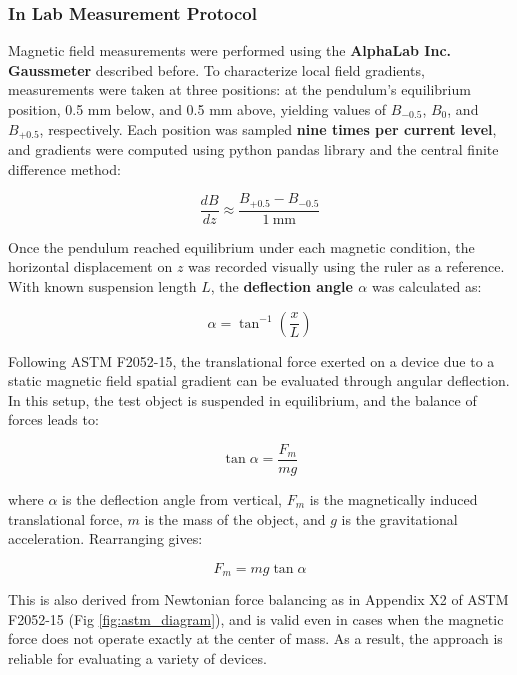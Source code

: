 \subsubsection*{In Lab Measurement Protocol}

Magnetic field measurements were performed using the \textbf{AlphaLab Inc. Gaussmeter} described before. To characterize local field gradients, measurements were taken at three positions: at the pendulum's equilibrium position, 0.5 mm below, and 0.5 mm above, yielding values of $B_{-0.5}$, $B_0$, and $B_{+0.5}$, respectively. Each position was sampled \textbf{nine times per current level}, and gradients were computed using python pandas library and the central finite difference method:

\begin{equation}
	\frac{dB}{dz} \approx \frac{B_{+0.5} - B_{-0.5}}{1\ \text{mm}}
\end{equation}

Once the pendulum reached equilibrium under each magnetic condition, the horizontal displacement on $z$ was recorded visually using the ruler as a reference. With known suspension length $L$, the \textbf{deflection angle $\alpha$} was calculated as:

\begin{equation}
	\alpha = \tan^{-1}\left(\frac{x}{L}\right)
\end{equation}

Following ASTM F2052-15, the translational force exerted on a device due to a static magnetic field spatial gradient can be evaluated through angular deflection. In this setup, the test object is suspended in equilibrium, and the balance of forces leads to:

\begin{equation}
	\tan \alpha = \frac{F_m}{mg}
\end{equation}

where $\alpha$ is the deflection angle from vertical, $F_m$ is the magnetically induced translational force, $m$ is the mass of the object, and $g$ is the gravitational acceleration. Rearranging gives:

\begin{equation}
	F_m = mg \tan \alpha
\end{equation}

This is also derived from Newtonian force balancing as in Appendix X2 of ASTM F2052-15 (Fig \ref{fig:astm_diagram}), and is valid even in cases when the magnetic force does not operate exactly at the center of mass. As a result, the approach is reliable for evaluating a variety of devices.

